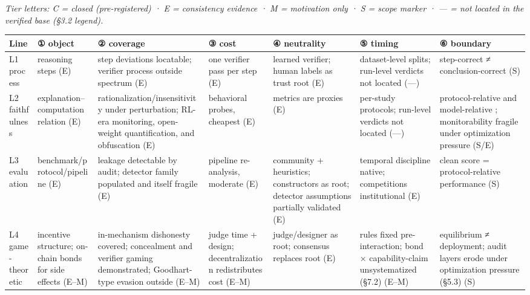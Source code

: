 \documentclass[11pt,a4paper]{article}
\begin{document}
\textit{Tier letters: C = closed (pre-registered) · E = consistency evidence · M = motivation only · S = scope marker · — = not located in the verified base (§3.2 legend).}

\begin{table}[htbp]
\centering
\scriptsize
\setlength{\tabcolsep}{2.5pt}
\renewcommand{\arraystretch}{1.18}
\begin{tabularx}{0.985\textwidth}{>{\raggedright\arraybackslash}p{} *{6}{>{\raggedright\arraybackslash}p{}}}
\toprule
\textbf{Line} & \textbf{① object} & \textbf{② coverage} & \textbf{③ cost} & \textbf{④ neutrality} & \textbf{⑤ timing} & \textbf{⑥ boundary} \\
\midrule
L1 process \cite{key05,key06} & reasoning steps (E) & step deviations locatable; verifier process outside spectrum (E) & one verifier pass per step (E) & learned verifier; human labels as trust root (E) & dataset-level splits; run-level verdicts not located (—) & step-correct ≠ conclusion-correct (S) \\
L2 faithfulness \cite{key02,key03,key29,key30,key31,key32,key33,key34} & explanation–computation relation (E) & rationaliza\-tion\slash insensitivity under perturbation; RL-era monitoring, open-weight quantification, and obfuscation \cite{key30,key31,key32,key34} (E) & behavioral probes, cheapest (E) & metrics are proxies (E) & per-study protocols; run-level verdicts not located (—) & protocol-relative and model-relative \cite{key32}; monitorability fragile under optimization pressure \cite{key30,key32,key33,key34} (S\slash E) \\
L3 evaluation \cite{key07,key08,key35,key36,key37,key38,key39,key40,key41,key42} & benchmark\slash protocol\slash pipeline (E) & leakage detectable by audit; detector family populated and itself fragile \cite{key36,key37,key38,key39,key40,key41,key42} (E) & pipeline re-analysis, moderate (E) & community + heuristics; constructors as root; detector assumptions partially validated \cite{key39} (E) & temporal discipline native; competitions institutional \cite{key35} (E) & clean score = protocol-relative performance (S) \\
L4 game-theoretic \cite{key09,key10,key43,key44,key45,key46,key47,key48,key49,key50,key51} & incentive structure; on-chain bonds for side effects \cite{key48,key49,key50} (E–M) & in-mechanism dishonesty covered; concealment \cite{key30} and verifier gaming \cite{key47} demonstrated; Goodhart-type evasion outside (E–M) & judge time + design; decentralization redistributes cost \cite{key44,key45,key46} (E–M) & judge\slash designer as root; consensus replaces root \cite{key44,key45,key46} (E) & rules fixed pre-interaction; bond × capability-claim unsystematized (§7.2) (E–M) & equilibrium ≠ deployment; audit layers erode under optimization pressure (§5.3) (S) \\

\end{tabularx}
\end{table}
\end{document}
